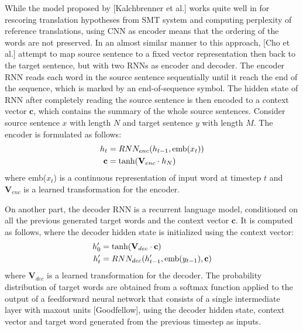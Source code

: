 \documentclass[12pt]{extarticle}
\begin{document}
While the model proposed by [Kalchbrenner et al.] works quite well in for rescoring translation hypotheses from SMT system and computing perplexity of reference translations, using CNN as encoder means that the ordering of the words are not preserved. In an almost similar manner to this approach, [Cho et al.] attempt to map source sentence to a fixed vector representation then back to the target sentence, but with two RNNs as encoder and decoder. The encoder RNN reads each word in the source sentence sequentially until it reach the end of the sequence, which is marked by an end-of-sequence symbol. The hidden state of RNN after completely reading the source sentence is then encoded to a context vector $\textbf{c}$, which contains the summary of the whole source sentences. Consider source sentence $x$ with length $N$ and target sentence $y$ with length $M$. The encoder is formulated as follows:
\begin{align}
h_{t} &= RNN_{enc}(h_{t-1}, \textnormal{emb}(x_{t})) \\
\textbf{c} &= \textnormal{tanh}(\textbf{V}_{enc} \cdot h_{N})
\end{align}
where emb($x_{t}$) is a continuous representation of input word at timestep $t$ and $\textbf{V}_{enc}$ is a learned transformation for the encoder. 

On another part, the decoder RNN is a recurrent language model, conditioned on all the previous generated target words and the context vector $\textbf{c}$. It is computed as follows, where the decoder hidden state is initialized using the context vector:
\begin{align} 
h'_{0} &= \textnormal{tanh}(\textbf{V}_{dec} \cdot \textbf{c}) \\
h'_{t} &= RNN_{dec}(h'_{t-1}, \textnormal{emb}(y_{t-1}), \textbf{c}) 
\label{eq:18}
\end{align}
where $\textbf{V}_{dec}$ is a learned transformation for the decoder. The probability distribution of target words are obtained from a softmax function applied to the output of a feedforward neural network that consists of a single intermediate layer with maxout units [Goodfellow], using the decoder hidden state, context vector and target word generated from the previous timestep as inputs.
\end{document}
